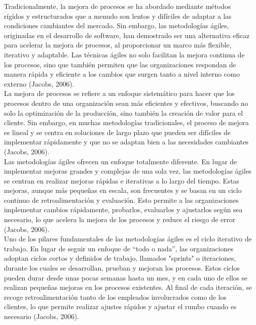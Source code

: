 \documentclass[12pt,letterpaper,spanish, xcolor=table]{report}
\numberwithin{figure}{subsection}
\begin{document}
Tradicionalmente, la mejora de procesos se ha abordado mediante métodos rígidos y estructurados que a menudo son lentos y difíciles de adaptar a las condiciones cambiantes del mercado. Sin embargo, las metodologías ágiles, originadas en el desarrollo de software, han demostrado ser una alternativa eficaz para acelerar la mejora de procesos, al proporcionar un marco más flexible, iterativo y adaptable. Las técnicas ágiles no solo facilitan la mejora continua de los procesos, sino que también permiten que las organizaciones respondan de manera rápida y eficiente a los cambios que surgen tanto a nivel interno como externo (Jacobs, 2006).\\

La mejora de procesos se refiere a un enfoque sistemático para hacer que los procesos dentro de una organización sean más eficientes y efectivos, buscando no solo la optimización de la producción, sino también la creación de valor para el cliente. Sin embargo, en muchas metodologías tradicionales, el proceso de mejora es lineal y se centra en soluciones de largo plazo que pueden ser difíciles de implementar rápidamente y que no se adaptan bien a las necesidades cambiantes (Jacobs, 2006).\\

Las metodologías ágiles ofrecen un enfoque totalmente diferente. En lugar de implementar mejoras grandes y complejas de una sola vez, las metodologías ágiles se centran en realizar mejoras rápidas e iterativas a lo largo del tiempo. Estas mejoras, aunque más pequeñas en escala, son frecuentes y se basan en un ciclo continuo de retroalimentación y evaluación. Esto permite a las organizaciones implementar cambios rápidamente, probarlos, evaluarlos y ajustarlos según sea necesario, lo que acelera la mejora de los procesos y reduce el riesgo de error (Jacobs, 2006).\\

Uno de los pilares fundamentales de las metodologías ágiles es el ciclo iterativo de trabajo. En lugar de seguir un enfoque de “todo o nada”, las organizaciones adoptan ciclos cortos y definidos de trabajo, llamados "sprints" o iteraciones, durante los cuales se desarrollan, prueban y mejoran los procesos. Estos ciclos pueden durar desde unas pocas semanas 
hasta un mes, y en cada uno de ellos se realizan pequeñas mejoras en los procesos existentes. Al final de cada iteración, se recoge retroalimentación tanto de los empleados involucrados como de los clientes, lo que permite realizar ajustes rápidos y ajustar el rumbo cuando es necesario (Jacobs, 2006).\\
\end{document}
